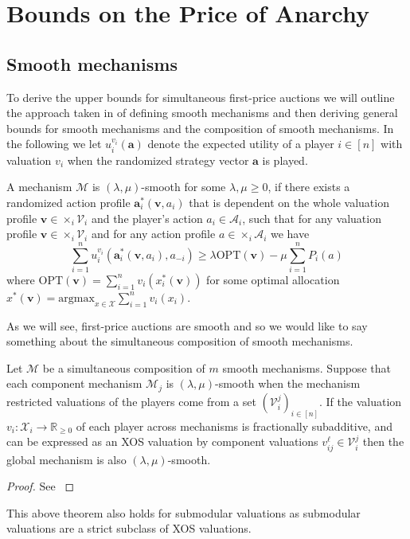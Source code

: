\section{Bounds on the Price of Anarchy} %
\label{Bounds on the Price of Anarchy}
\subsection{Smooth mechanisms} %
\label{sub:Smooth mechanisms}
To derive the upper bounds for simultaneous first-price auctions we will outline the approach taken in \cite{Syrgkanis2013Composable} of defining smooth mechanisms and then deriving general bounds for smooth mechanisms and the composition of smooth mechanisms. In the following we let $ u_i^{v_i}(\mathbf{a}) $ denote the expected utility of a player $ i \in [n] $ with valuation $ v_i $ when the randomized strategy vector $ \mathbf{a} $ is played.

\begin{definition}
  A mechanism $ \mathcal{M} $ is $ (\lambda, \mu) $-smooth for some $ \lambda,\mu\geq 0 $, if there exists a randomized action profile $ \mathbf{a}_i^{*}(\mathbf{v}, a_i) $ that is dependent on the whole valuation profile $ \mathbf{v} \in \times_i \mathcal{V}_i $ and the player's action $ a_i \in \mathcal{A}_i $, such that for any valuation profile $ \mathbf{v} \in \times_i \mathcal{V}_i $ and for any action profile $ a \in \times_i \mathcal{A}_i $ we have
  \begin{equation}
    \sum_{i = 1}^{n} u_i^{v_i}(\mathbf{a}^*_i(\mathbf{v}, a_i), a_{-i}) \geq \lambda \text{OPT}(\mathbf{v}) - \mu \sum_{i = 1}^{n} P_i(a)
    \label{eq:smooth-mechanism}
  \end{equation}
  where $ \text{OPT}(\mathbf{v}) = \sum_{i = 1}^{n} v_i(x_i^*(\mathbf{v})) $ for some optimal allocation $ x^*(\mathbf{v}) = \text{argmax}_{x \in \mathcal{X}} \sum_{i = 1}^{n} v_i(x_i) $.
\end{definition}

As we will see, first-price auctions are smooth and so we would like to say something about the simultaneous composition of smooth mechanisms.

\begin{theorem}
  \label{thm:comp}
  Let $ \mathcal{M} $ be a simultaneous composition of $ m $ smooth mechanisms. Suppose that each component mechanism $ \mathcal{M}_j $ is $ (\lambda, \mu) $-smooth when the mechanism restricted valuations of the players come from a set $ (\mathcal{V}_i^{j})_{i \in [n]} $. If the valuation $ v_i:\mathcal{X}_i \to \mathbb{R}_{\geq 0} $ of each player across mechanisms is fractionally subadditive, and can be expressed as an XOS valuation by component valuations $ v_{ij}^{\ell} \in \mathcal{V}_{i}^{j} $ then the global mechanism is also $ (\lambda, \mu) $-smooth.
\end{theorem}
\begin{proof}
  See \cite[Theorem 5.1]{Syrgkanis2013Composable}
\end{proof}
This above theorem also holds for submodular valuations as submodular valuations are a strict subclass of XOS valuations.

